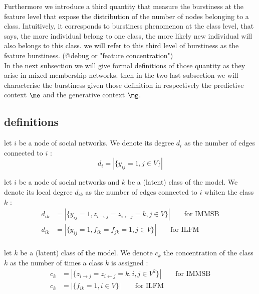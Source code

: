 Furthermore we introduce a third quantity that measure the burstiness at the feature level that expose the distribution of the number of nodes belonging to a class. Intuitively, it corresponds to burstiness phenomenon at the class level, that says, the more individual belong to one class, the more likely new individual will also belongs to this class. we will refer to this third level of burstiness as the {\large feature burstiness}. (@debug or "feature concentration") ~\\


In the next subsection we will give formal definitions of those quantity as they arise in mixed membership networks. then in the two last subsection we will characterise the burstiness given those definition in respectively the predictive context $\me$ and the generative context $\mg$.

\subsection{definitions}
\label{sec:definitions}

\begin{definition}
    let $i$ be a node of social networks. We denote its degree $d_i$ as the number of edges connected to $i$ : 
    \begin{equation}
        d_i = |\{y_{ij}=1, j \in V\}|
    \end{equation}
\end{definition}

\begin{definition}
    let $i$ be a node of social networks and $k$ be a (latent) class of the model. We denote its local degree $d_{ik}$ as the number of edges connected to $i$ whiten the class $k$ : 
    \begin{align}
        d_{ik} &= |\{y_{ij}=1, z_{i\rightarrow j}=z_{i\leftarrow j}=k,  j \in V\}| \qquad \textrm{for IMMSB} \\
        d_{ik} &= |\{y_{ij}=1, f_{ik}=f_{jk}=1,  j \in V\}| \qquad \textrm{for ILFM} \\
    \end{align}
\end{definition}

\begin{definition}
    let $k$ be a (latent) class of the model. We denote $c_k$ the concentration of the class $k$ as the number of times a class $k$ is assigned : 
    \begin{align}
        c_{k} &= |\{ z_{i\rightarrow j}=z_{i\leftarrow j}=k,  i, j \in V^2\}| \qquad \textrm{for IMMSB} \\
        c_{k} &= |\{ f_{ik}=1,  i \in V\}| \qquad \textrm{for ILFM} \\
    \end{align}
\end{definition}


